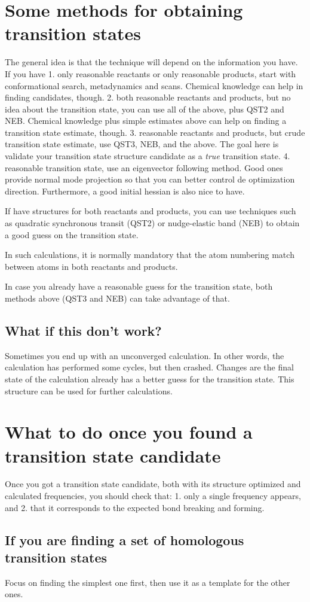 \section{Some methods for obtaining transition states}

The general idea is that the technique will depend on the information you have.
If you have
1. only reasonable reactants or only reasonable products, start with conformational search,
metadynamics and scans. Chemical knowledge can help in finding candidates,
though.
2. both reasonable reactants and products, but no idea about the transition state, you can use
all of the above, plus QST2 and NEB. Chemical knowledge plus simple estimates
above can help on finding a transition state estimate, though.
3. reasonable reactants and products, but crude transition state estimate, use QST3, NEB, and the above. The
goal here is validate your transition state structure candidate as a
\emph{true} transition state.
4. reasonable transition state, use an eigenvector following method. Good ones
provide normal mode projection so that you can better control de optimization
direction. Furthermore, a good initial hessian is also nice to have.

If have structures for both reactants and products, you can use techniques such
as quadratic synchronous transit (QST2) or nudge-elastic band (NEB) to obtain a
good guess on the transition state.

In such calculations, it is normally mandatory that the atom numbering match
between atoms in both reactants and products.

In case you already have a reasonable guess for the transition state, both
methods above (QST3 and NEB) can take advantage of that.

\subsection{What if this don't work?}

Sometimes you end up with an unconverged calculation.
In other words, the calculation has performed some cycles, but then crashed.
Changes are the final state of the calculation already has a better guess for
the transition state.
This structure can be used for further calculations.

\section{What to do once you found a transition state candidate}

Once you got a transition state candidate, both with its structure optimized
and calculated frequencies, you should check that:
1. only a single frequency appears, and
2. that it corresponds to the expected bond breaking and forming.

\subsection{If you are finding a set of homologous transition states}

Focus on finding the simplest one first, then use it as a template for the
other ones.
